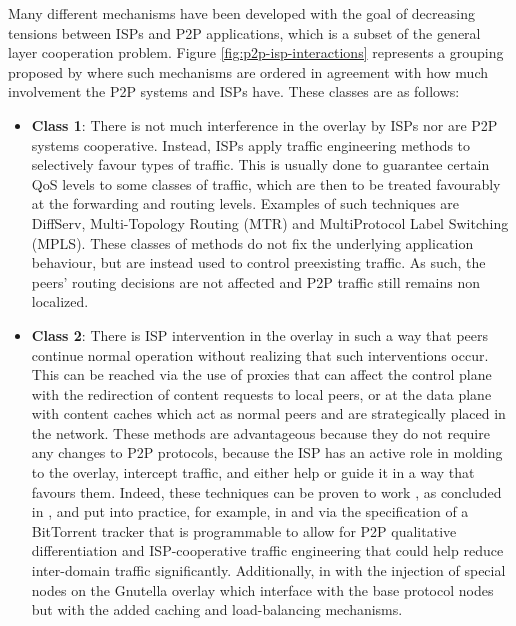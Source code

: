         Many different mechanisms have been developed with the goal of decreasing tensions between ISPs and P2P applications, which is a subset of the general layer cooperation problem.
        Figure \ref{fig:p2p-isp-interactions} represents a grouping proposed by \cite{dan-Commag10} where such mechanisms are ordered in agreement with how much involvement the P2P systems and ISPs have. These classes are as follows:

    \begin{itemize}
        \item \textbf{Class 1}:
            There is not much interference in the overlay by ISPs nor are P2P systems cooperative.
            Instead, ISPs apply traffic engineering methods to selectively favour types of traffic.
            This is usually done to guarantee certain QoS levels to some classes of traffic, which are then to be treated favourably at the forwarding and routing levels.
            Examples of such techniques are DiffServ, Multi-Topology Routing (MTR) and MultiProtocol Label Switching (MPLS).
            These classes of methods do not fix the underlying application behaviour, but are instead used to control preexisting traffic.
            As such, the peers' routing decisions are not affected and P2P traffic still remains non localized.
        \item \textbf{Class 2}:
            There is ISP intervention in the overlay in such a way that peers continue normal operation without realizing that such interventions occur.
            This can be reached via the use of proxies that can affect the control plane with the redirection of content requests to local peers, or at the data plane with content caches which act as normal peers and are strategically placed in the network.
            These methods are advantageous because they do not require any changes to P2P protocols, because the ISP has an active role in molding to the overlay, intercept traffic, and either help or guide it in a way that favours them.
            Indeed, these techniques can be proven to work , as concluded in \cite{dan-Commag10}, and put into practice, for example, in \cite{programmable-trackers} and \cite{configurable-trackers} via the specification of a BitTorrent tracker that is programmable to allow for P2P qualitative differentiation and ISP-cooperative traffic engineering that could help reduce inter-domain traffic significantly.
            Additionally, in \cite{freeriding-gnutella} with the injection of special nodes on the Gnutella overlay which interface with the base protocol nodes but with the added caching and load-balancing mechanisms.

\end{itemize}
